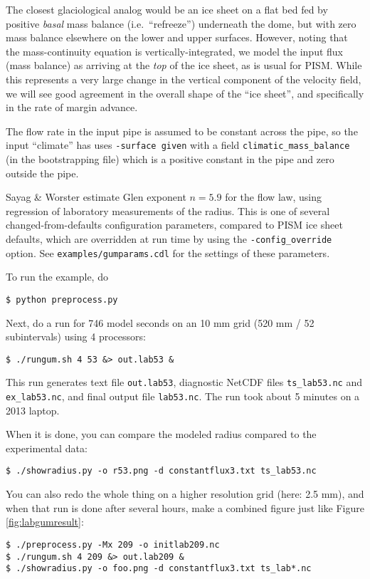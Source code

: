 The closest glaciological analog would be an ice sheet on a flat bed fed by positive \emph{basal} mass balance (i.e.~``refreeze'') underneath the dome, but with zero mass balance elsewhere on the lower and upper surfaces.  However, noting that the mass-continuity equation is vertically-integrated, we model the input flux (mass balance) as arriving at the \emph{top} of the ice sheet, as is usual for PISM.  While this represents a very large change in the vertical component of the velocity field, we will see good agreement in the overall shape of the ``ice sheet'', and specifically in the rate of margin advance.

The flow rate in the input pipe is assumed to be constant across the pipe, so the input ``climate'' has uses \texttt{-surface given} with a field \texttt{climatic_mass_balance} (in the bootstrapping file) which is a positive constant in the pipe and zero outside the pipe.

Sayag \& Worster estimate Glen exponent $n = 5.9$ for the flow law, using regression of laboratory measurements of the radius.  This is one of several changed-from-defaults configuration parameters, compared to PISM ice sheet defaults, which are overridden at run time by using the \texttt{-config_override} option.  See \texttt{examples/gumparams.cdl} for the settings of these parameters.

To run the example, do

\begin{verbatim}
$ python preprocess.py
\end{verbatim}%

Next, do a run for 746 model seconds \cite{SayagWorster2013} on an 10 mm grid (520 mm / 52 subintervals) using 4 processors:
\begin{verbatim}
$ ./rungum.sh 4 53 &> out.lab53 &
\end{verbatim}%
This run generates text file \texttt{out.lab53}, diagnostic NetCDF files \texttt{ts_lab53.nc} and \texttt{ex_lab53.nc}, and final output file \texttt{lab53.nc}.  The run took about 5 minutes on a 2013 laptop.

When it is done, you can compare the modeled radius compared to the experimental data:
\begin{verbatim}
$ ./showradius.py -o r53.png -d constantflux3.txt ts_lab53.nc
\end{verbatim}%
You can also redo the whole thing on a higher resolution grid (here: 2.5 mm), and when that run is done after several hours, make a combined figure just like Figure \ref{fig:labgumresult}:
\begin{verbatim}
$ ./preprocess.py -Mx 209 -o initlab209.nc
$ ./rungum.sh 4 209 &> out.lab209 &
$ ./showradius.py -o foo.png -d constantflux3.txt ts_lab*.nc
\end{verbatim}%

